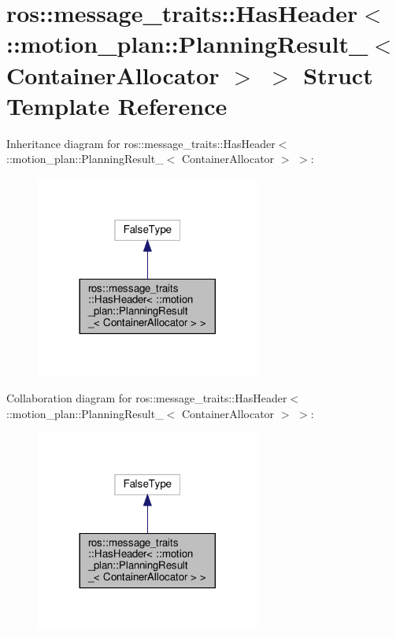 \hypertarget{structros_1_1message__traits_1_1HasHeader_3_01_1_1motion__plan_1_1PlanningResult___3_01ContainerAllocator_01_4_01_4}{}\section{ros\+:\+:message\+\_\+traits\+:\+:Has\+Header$<$ \+:\+:motion\+\_\+plan\+:\+:Planning\+Result\+\_\+$<$ Container\+Allocator $>$ $>$ Struct Template Reference}
\label{structros_1_1message__traits_1_1HasHeader_3_01_1_1motion__plan_1_1PlanningResult___3_01ContainerAllocator_01_4_01_4}


Inheritance diagram for ros\+:\+:message\+\_\+traits\+:\+:Has\+Header$<$ \+:\+:motion\+\_\+plan\+:\+:Planning\+Result\+\_\+$<$ Container\+Allocator $>$ $>$\+:
\nopagebreak
\begin{figure}[H]
\begin{center}
\leavevmode
\includegraphics[width=209pt]{structros_1_1message__traits_1_1HasHeader_3_01_1_1motion__plan_1_1PlanningResult___3_01Container626b875ce14537d3d78ecf67eb8a88ae}
\end{center}
\end{figure}


Collaboration diagram for ros\+:\+:message\+\_\+traits\+:\+:Has\+Header$<$ \+:\+:motion\+\_\+plan\+:\+:Planning\+Result\+\_\+$<$ Container\+Allocator $>$ $>$\+:
\nopagebreak
\begin{figure}[H]
\begin{center}
\leavevmode
\includegraphics[width=209pt]{structros_1_1message__traits_1_1HasHeader_3_01_1_1motion__plan_1_1PlanningResult___3_01Container49339381a4d4d7c039a18b9c69712135}
\end{center}
\end{figure}


